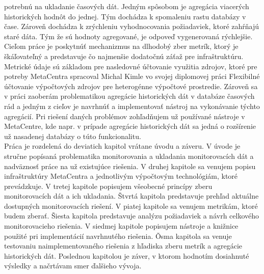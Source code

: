 \documentclass[printed,11pt,twoside,color,cover,table]{fithesis3}
\begin{document}
potrebnú na ukladanie časových dát. Jedným spôsobom je agregácia viacerých historických hodnôt do jednej. Tým dochádza k spomaleniu rastu
databázy v čase. Zároveň dochádza k zrýchleniu vyhodnocovania požiadaviek, ktoré zahŕňajú staré dáta. Tým že sú hodnoty agregované,
je odpoveď vygenerovaná rýchlejšie.
\\Cieľom práce je poskytnúť mechanizmus na dlhodobý zber metrík, ktorý je škáľovateľný a predstavuje čo najmenšie dodatočnú záťaž
pre infraštruktúru. Metrické údaje sú základom pre nasledovné účtovanie využitia zdrojov, ktoré pre potreby MetaCentra spracoval
Michal Kimle vo svojej diplomovej práci Flexibilné účtovanie výpočtových zdrojov pre heterogénne výpočtové prostredie.
Zároveň sa v práci zaoberám problematikou agregácie historických dát v databáze časových rád a jedným z cieľov je navrhnúť a 
implementovať nástroj na vykonávanie týchto agregácií. Pri riešení daných problémov zohľadňujem už používané nástroje v MetaCentre,
kde napr. v prípade agregácie historických dát sa jedná o rozšírenie už nasadenej databázy o túto funkcionalitu.
\\Práca je rozdelená do deviatich kapitol vrátane úvodu a záveru. V úvode je stručne popísaná problematika monitorovania a ukladania
monitorovacích dát a nadväznosť práce na už existujúce riešenia. V druhej kapitole sa venujem popisu infraštruktúry MetaCentra a 
jednotlivým výpočtovým technológiám, ktoré prevádzkuje. V tretej kapitole popisujem všeobecné princípy zberu monitorovacích dát
a ich ukladania. Štvrtá kapitola predstavuje prehľad aktuálne dostupných monitorovacích riešení. V piatej kapitole sa venujem
metrikám, ktoré budem zberať. Šiesta kapitola predstavuje analýzu požiadaviek a návrh celkového monitorovacieho riešenia.
V siedmej kapitole popisujem nástroje a knižnice použité pri implementácií navrhnutého riešenia. Ǒsma kapitola sa venuje
testovaniu naimplementovaného riešenia z hľadiska zberu metrík a agregácie historických dát. Poslednou kapitolou
je záver, v ktorom hodnotím dosiahnuté výsledky a načrtávam smer ďalšieho vývoja.
\end{document}
